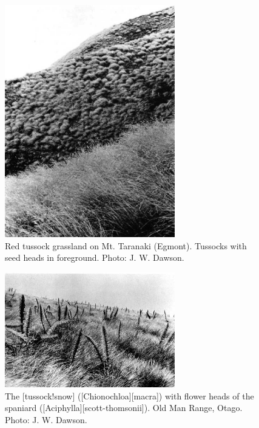 \begin{figure}
	\includegraphics[width=0.66\textwidth]{graphics/figure95red-tussock.jpg}
	\centering
	\caption[Red tussock grassland on Mt. Taranaki]{Red tussock grassland on Mt. Taranaki (Egmont).
	Tussocks with seed heads in foreground.
	Photo: J. W. Dawson.}%
	\label{fig:95red-tussock}
\end{figure}

\begin{figure}
	\includegraphics[width=0.66\textwidth]{graphics/figure96snow-tussock.jpg}
	\centering
	\caption[Snow tussock]{The [tussock!snow] ([Chionochloa][macra]) with flower heads of the spaniard ([Aciphylla][scott-thomsonii]).
	Old Man Range, Otago.
	Photo: J. W. Dawson.}%
	\label{fig:96snow-tussock}
\end{figure}

